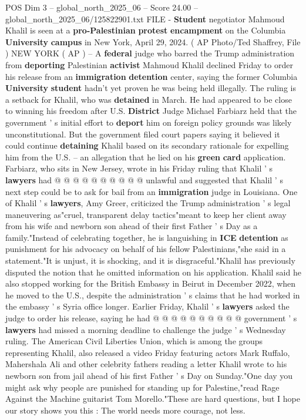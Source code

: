 \begin{textsample}{POS Dim 3 – global\_north\_2025\_06 – Score 24.00 – global\_north\_2025\_06/125822901.txt}  \label{ex:f3_pos_105}
FILE - \textbf{Student} negotiator Mahmoud Khalil is seen at a \textbf{pro-Palestinian} \textbf{protest} \textbf{encampment} on the Columbia \textbf{University} \textbf{campus} in New York, April 29, 2024. ( AP Photo/Ted Shaffrey, File ) NEW YORK ( AP ) -- A \textbf{federal} judge who barred the Trump administration from \textbf{deporting} Palestinian \textbf{activist} Mahmoud Khalil declined Friday to order his release from an \textbf{immigration} \textbf{detention} center, saying the former Columbia \textbf{University} \textbf{student} hadn't yet proven he was being held illegally.
The ruling is a setback for Khalil, who was \textbf{detained} in March.
He had appeared to be close to winning his freedom after U.S. \textbf{District} Judge Michael Farbiarz held that the government ' s initial effort to \textbf{deport} him on foreign policy grounds was likely unconstitutional.
But the government filed court papers saying it believed it could continue \textbf{detaining} Khalil based on its secondary rationale for expelling him from the U.S. -- an allegation that he lied on his \textbf{green} \textbf{card} application.
Farbiarz, who sits in New Jersey, wrote in his Friday ruling that Khalil ' s \textbf{lawyers} had @ @ @ @ @ @ @ @ @ @ unlawful and suggested that Khalil ' s next step could be to ask for bail from an \textbf{immigration} judge in Louisiana.
One of Khalil ' s \textbf{lawyers}, Amy Greer, criticized the Trump administration ' s legal maneuvering as"cruel, transparent delay tactics"meant to keep her client away from his wife and newborn son ahead of their first Father ' s Day as a family."Instead of celebrating together, he is languishing in \textbf{ICE} \textbf{detention} as punishment for his advocacy on behalf of his fellow Palestinians,"she said in a statement."It is unjust, it is shocking, and it is disgraceful."Khalil has previously disputed the notion that he omitted information on his application.
Khalil said he also stopped working for the British Embassy in Beirut in December 2022, when he moved to the U.S., despite the administration ' s claims that he had worked in the embassy ' s Syria office longer.
Earlier Friday, Khalil ' s \textbf{lawyers} asked the judge to order his release, saying he had @ @ @ @ @ @ @ @ @ @ government ' s \textbf{lawyers} had missed a morning deadline to challenge the judge ' s Wednesday ruling.
The American Civil Liberties Union, which is among the groups representing Khalil, also released a video Friday featuring actors Mark Ruffalo, Mahershala Ali and other celebrity fathers reading a letter Khalil wrote to his newborn son from jail ahead of his first Father ' s Day on Sunday."One day you might ask why people are punished for standing up for Palestine,"read Rage Against the Machine guitarist Tom Morello."These are hard questions, but I hope our story shows you this : The world needs more courage, not less.

\end{textsample}
